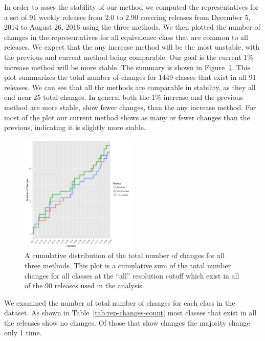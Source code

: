 In order to asses the stability of our method we computed the representatives
for a set of 91 weekly releases from 2.0 to 2.90 covering releases from December
5, 2014 to August 26, 2016 using the three methods. We then plotted the number
of changes in the representatives for all equivalence class that are common to
all releases. We expect that the any increase method will be the most unstable,
with the previous and current method being comparable. Our goal is the current
1\% increase method will be more stable. The summary is shown in
Figure~\ref{fig:rep-changes}. This plot summarizes the total number of changes
for 1449 classes that exist in all 91 releases. We can see that all thr%
methods are comparable in stability, as they all end near 25 total changes. In
general both the 1\% increase and the previous method are more stable, show fewer
changes, than the any increase method. For most of the plot our current method
shows as many or fewer changes than the previous, indicating it is slightly more
stable.

\begin{figure}
  \includegraphics[width=0.5\textwidth]{chapter-4/figs/rep-count-changes}
  \caption{A cumulative distribution of the total number of changes for all
    three methods. This plot is a cumulative sum of the total number changes for
    all classes at the ``all'' resolution cutoff which exist in all of the 90
  releases used in the analysis.}
\label{fig:rep-changes}
\end{figure}

We examined the number of total number of changes for each class in the dataset.
As shown in Table~\ref{tab:rep-changes-count} most classes that exist in all the
releases show no changes. Of those that show changes the majority change only 1
time.

